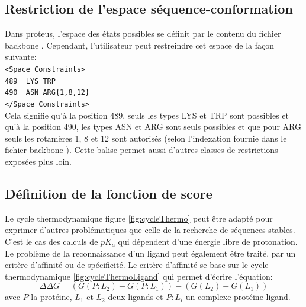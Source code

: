 \subsection{Restriction de l'espace séquence-conformation}
\label{sub:restric}
Dans proteus, l'espace des états possibles se définit par le contenu du fichier \og backbone \fg. Cependant, l'utilisateur peut restreindre cet espace de la façon suivante:\\
\verb!<Space_Constraints>! \\
\verb!489  LYS TRP! \\
\verb!490  ASN ARG{1,8,12}! \\
\verb!</Space_Constraints>! \\
Cela signifie qu'à la position 489, seuls les types LYS et TRP sont possibles et qu'à la position 490, les types ASN et ARG sont seuls possibles et que pour ARG seuls les rotamères 1, 8  et 12 sont autorisés (selon l'indexation fournie dans le fichier \og backbone \fg). Cette balise permet aussi d'autres classes de restrictions exposées plus loin.

\subsection{Définition de la fonction de score }

Le cycle thermodynamique figure \ref{fig:cycleThermo} peut être adapté pour exprimer d'autres problématiques que celle de la recherche de séquences stables. C'est le cas des calculs de $pK_a$ qui dépendent d'une énergie libre de protonation. Le  problème de la reconnaissance d'un ligand peut également être traité, par un critère d'affinité ou de spécificité. Le critère d'affinité se base sur le cycle thermodynamique  \ref{fig:cycleThermoLigand} qui permet d'écrire l'équation:
\begin{equation}
   \label{deltaG2}
\Delta \Delta G = (G(P\!:\!L_2)- G(P\!:\!L_1)) - (G(L_2) - G(L_1))
\end{equation}  
avec $P$ la protéine, $L_1$ et $L_2$ deux ligands et $P\!:\!L_i$ un complexe protéine-ligand. 

